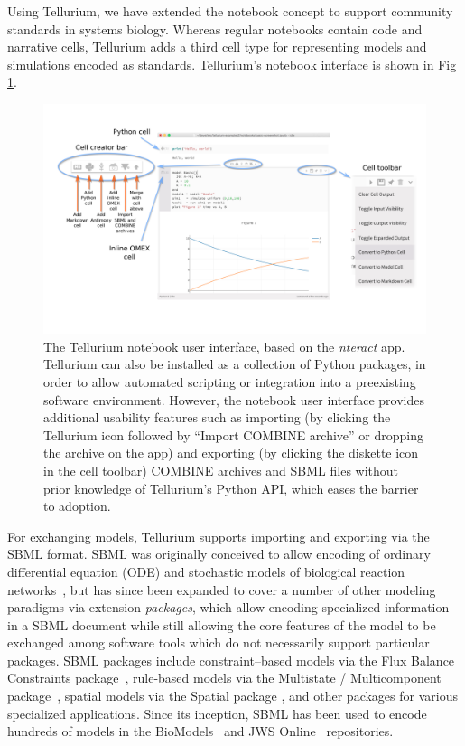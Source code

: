 \documentclass[10pt,letterpaper]{article}
\begin{document}
Using Tellurium, we have extended the notebook concept to support community standards in systems biology. Whereas regular notebooks contain code and narrative cells, Tellurium adds a third cell type for representing models and simulations encoded as standards. Tellurium's notebook interface is shown in Fig \ref{fig:interface}.

\begin{figure}
  \includegraphics[width=\textwidth]{fig-interface.png}
  \caption{The Tellurium notebook user interface, based on the \textit{nteract} app. Tellurium can also be installed as a collection of Python packages, in order to allow automated scripting or integration into a preexisting software environment. However, the notebook user interface provides additional usability features such as importing (by clicking the Tellurium icon followed by ``Import COMBINE archive'' or dropping the archive on the app) and exporting (by clicking the diskette icon in the cell toolbar) COMBINE archives and SBML files without prior knowledge of Tellurium's Python API, which eases the barrier to adoption. }
  \label{fig:interface}
\end{figure}

For exchanging models, Tellurium supports importing and exporting via the SBML format. SBML was originally conceived to allow encoding of ordinary differential equation (ODE) and stochastic models of biological reaction networks~\cite{hucka2003systems}, but has since been expanded to cover a number of other modeling paradigms via extension \textit{packages}, which allow encoding specialized information in a SBML document while still allowing the core features of the model to be exchanged among software tools which do not necessarily support particular packages. SBML packages include constraint--based models via the Flux Balance Constraints package~\cite{sbmlfbc}, rule-based models via the Multistate / Multicomponent package~\cite{sbmlmulti}, spatial models via the Spatial package \cite{sbmlspatial}, and other packages for various specialized applications. Since its inception, SBML has been used to encode hundreds of models in the BioModels~\cite{le2006biomodels,li2010biomodels} and JWS Online~\cite{olivier2004web} repositories.
\end{document}
